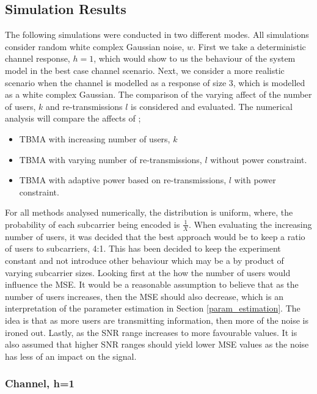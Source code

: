 \documentclass{article}
\begin{document}
\subsection{Simulation Results}
The following simulations were conducted in two different modes. All simulations consider random white complex Gaussian noise, $w$. First we take a deterministic channel response, $h=1$, which would show to us the behaviour of the system model in the best case channel scenario. Next, we consider a more realistic scenario when the channel is modelled as a response of size 3, which is modelled as a white complex Gaussian. The comparison of the varying affect of the number of users, $k$ and re-transmissions $l$ is considered and evaluated. 
The numerical analysis will compare the affects of ;
\begin{itemize}
    \item TBMA with increasing number of users, $k$
    \item TBMA with varying number of re-transmissions, $l$ without power constraint.
    \item TBMA with adaptive power based on re-transmissions,  $l$ with power constraint.
\end{itemize}

For all methods analysed numerically, the distribution is uniform, where, the probability of each subcarrier being encoded is $\frac{1}{X}$. When evaluating the increasing number of users, it was decided that the best approach would be to keep a ratio of users to subcarriers, 4:1. This has been decided to keep the experiment constant and not introduce other behaviour which may be a by product of varying subcarrier sizes. 
Looking first at the how the number of users would influence the MSE. It would be a reasonable assumption to believe that as the number of users increases, then the MSE should also decrease, which is an interpretation of the parameter estimation in Section \ref{param_estimation}. The idea is that as more users are transmitting information, then more of the noise is ironed out. Lastly, as the SNR range increases to more favourable values. It is also assumed that higher SNR ranges should yield lower MSE values as the noise has less of an impact on the signal. 

\subsubsection{Channel, h=1}
\end{document}
